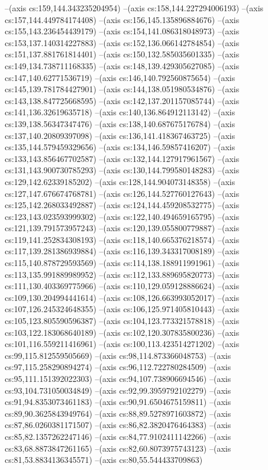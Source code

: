 --(axis cs:159,144.343235204954)
--(axis cs:158,144.227294006193)
--(axis cs:157,144.449784174408)
--(axis cs:156,145.135896884676)
--(axis cs:155,143.236454439179)
--(axis cs:154,141.086318048973)
--(axis cs:153,137.140314227883)
--(axis cs:152,136.066142784854)
--(axis cs:151,137.881761814401)
--(axis cs:150,132.585035601335)
--(axis cs:149,134.738711168335)
--(axis cs:148,139.429305627085)
--(axis cs:147,140.62771536719)
--(axis cs:146,140.792560875654)
--(axis cs:145,139.781784427901)
--(axis cs:144,138.051980534876)
--(axis cs:143,138.847725668595)
--(axis cs:142,137.201157085744)
--(axis cs:141,136.32619635718)
--(axis cs:140,136.864912113142)
--(axis cs:139,138.56347347476)
--(axis cs:138,140.687675176784)
--(axis cs:137,140.20809397098)
--(axis cs:136,141.418367463725)
--(axis cs:135,144.579459329656)
--(axis cs:134,146.59857416207)
--(axis cs:133,143.856467702587)
--(axis cs:132,144.127917961567)
--(axis cs:131,143.900730785293)
--(axis cs:130,144.799580148283)
--(axis cs:129,142.62339185202)
--(axis cs:128,144.904073148358)
--(axis cs:127,147.676674768781)
--(axis cs:126,144.527760127643)
--(axis cs:125,142.268033492887)
--(axis cs:124,144.459208532775)
--(axis cs:123,143.023593999302)
--(axis cs:122,140.494659165795)
--(axis cs:121,139.791573957243)
--(axis cs:120,139.055800779887)
--(axis cs:119,141.252834308193)
--(axis cs:118,140.665376218574)
--(axis cs:117,139.281386939884)
--(axis cs:116,139.343317008189)
--(axis cs:115,140.878729593569)
--(axis cs:114,138.188911991961)
--(axis cs:113,135.991889989952)
--(axis cs:112,133.889695820773)
--(axis cs:111,130.403369775966)
--(axis cs:110,129.059128886624)
--(axis cs:109,130.204994441614)
--(axis cs:108,126.663993052017)
--(axis cs:107,126.245324648355)
--(axis cs:106,125.971405810443)
--(axis cs:105,123.805590596387)
--(axis cs:104,123.773321578818)
--(axis cs:103,122.183068640189)
--(axis cs:102,120.307835800236)
--(axis cs:101,116.559211416961)
--(axis cs:100,113.423514271202)
--(axis cs:99,115.812559505669)
--(axis cs:98,114.873366048753)
--(axis cs:97,115.258290894274)
--(axis cs:96,112.722780284509)
--(axis cs:95,111.151392022303)
--(axis cs:94,107.738906694546)
--(axis cs:93,104.731050034849)
--(axis cs:92,99.3959792102279)
--(axis cs:91,94.8353073461183)
--(axis cs:90,91.6504675159811)
--(axis cs:89,90.3625843949764)
--(axis cs:88,89.5278971603872)
--(axis cs:87,86.0260381171507)
--(axis cs:86,82.3820476464383)
--(axis cs:85,82.1357262247146)
--(axis cs:84,77.9102411142266)
--(axis cs:83,68.8873847261165)
--(axis cs:82,60.8073975743123)
--(axis cs:81,53.8834136345571)
--(axis cs:80,55.544433709863)
